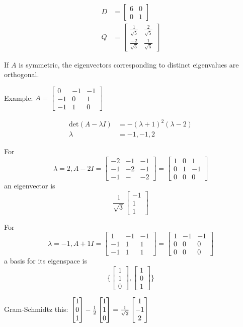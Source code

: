\documentclass[12pt]{article}
\newcommand{\vecthree}[3]{\begin{bmatrix}#1\\#2\\#3\end{bmatrix}}
\begin{document}
\begin{align*}
D &= \begin{bmatrix}6&0\\0&1\end{bmatrix}\\
Q &= \begin{bmatrix}\frac{1}{\sqrt{5}}&\frac{2}{\sqrt{5}}\\\frac{-2}{\sqrt{5}}&\frac{1}{\sqrt{5}}\end{bmatrix}
\end{align*}

\begin{theorem}
If $A$ is symmetric, the eigenvectors corresponding to distinct eigenvalues are orthogonal.
\end{theorem}

Example: $A = \begin{bmatrix}0&-1&-1\\-1&0&1\\-1&1&0\end{bmatrix}$

\begin{align*}
\text{det}(A-\lambda I) &= -(\lambda+1)^2(\lambda-2)\\
\lambda &= -1,-1,2
\end{align*}

For \[ \lambda = 2, A-2I = \begin{bmatrix}-2&-1&-1\\-1&-2&-1\\-1&-&-2\end{bmatrix} = \begin{bmatrix}1&0&1\\0&1&-1\\0&0&0\end{bmatrix} \] an eigenvector is \[ \frac{1}{\sqrt{3}}\vecthree{-1}{1}{1} \]

For \[ \lambda = -1, A+1I = \begin{bmatrix}1&-1&-1\\-1&1&1\\-1&1&1\end{bmatrix} = \begin{bmatrix}1&-1&-1\\0&0&0\\0&0&0\end{bmatrix} \] a basis for its eigenspace is \[ \bigg\{\vecthree{1}{1}{0},\vecthree{1}{0}{1}\bigg\} \]

Gram-Schmidtz this: $\vecthree{1}{0}{1} - \half \vecthree{1}{1}{0} = \frac{1}{\sqrt{2}}\vecthree{1}{-1}{2}$
\end{document}
